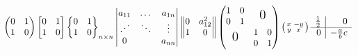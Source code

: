 ﻿\documentclass{ctexart}
\begin{document}
    \[%
    \begin{pmatrix}%
        0&1\\
        1&0\\
    \end{pmatrix}
    \begin{bmatrix}
        0&1\\
        1&0\\
    \end{bmatrix}
    \begin{Bmatrix}
        0&1\\
        1&0\\
    \end{Bmatrix}_{n \times n}
    \begin{vmatrix}
        a_{11}&\dots&a_{1n}\\
        \iddots&\ddots&\vdots\\
        0& & a_{nn}
    \end{vmatrix}
    \begin{Vmatrix}
        0&a_{12}^2\\
        1&0\\
    \end{Vmatrix}
    \begin{pmatrix}%
        \begin{matrix} 1&0\\0&1 \end{matrix}
        & \text{\Large 0}\\%
        \text{\Large0} & \begin{matrix}
        1&0\\0&1 \end{matrix}
    \end{pmatrix}
    \left(%
    \begin{smallmatrix}
        x&-y\\y&x
    \end{smallmatrix}
    \right)
    \begin{array}{r|r}
        \frac12&0\\
        \hline
        0&-\frac abc\\
    \end{array}
    \]
\end{document}
